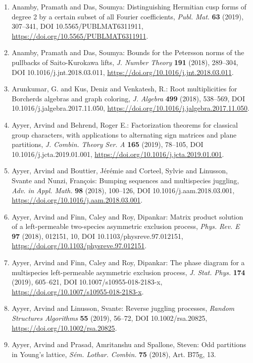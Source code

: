 \begin{enumerate}
\item Anamby, Pramath and Das, Soumya: Distinguishing {H}ermitian cusp forms of degree 2 by a certain
subset of all {F}ourier coefficients, \emph{Publ. Mat.} {\bf 63} (2019), 307--341, DOI 10.5565/PUBLMAT6311911, \url{https://doi.org/10.5565/PUBLMAT6311911}.
\item Anamby, Pramath and Das, Soumya: Bounds for the {P}etersson norms of the pullbacks of
{S}aito-{K}urokawa lifts, \emph{J. Number Theory} {\bf 191} (2018), 289--304, DOI 10.1016/j.jnt.2018.03.011, \url{https://doi.org/10.1016/j.jnt.2018.03.011}.
\item Arunkumar, G. and Kus, Deniz and Venkatesh, R.: Root multiplicities for {B}orcherds algebras and graph
coloring, \emph{J. Algebra} {\bf 499} (2018), 538--569, DOI 10.1016/j.jalgebra.2017.11.050, \url{https://doi.org/10.1016/j.jalgebra.2017.11.050}.
\item Ayyer, Arvind and Behrend, Roger E.: Factorization theorems for classical group characters, with
applications to alternating sign matrices and plane
partitions, \emph{J. Combin. Theory Ser. A} {\bf 165} (2019), 78--105, DOI 10.1016/j.jcta.2019.01.001, \url{https://doi.org/10.1016/j.jcta.2019.01.001}.
\item Ayyer, Arvind and Bouttier, J\'{e}r\'{e}mie and Corteel, Sylvie and
Linusson, Svante and Nunzi, Fran\c{c}ois: Bumping sequences and multispecies juggling, \emph{Adv. in Appl. Math.} {\bf 98} (2018), 100--126, DOI 10.1016/j.aam.2018.03.001, \url{https://doi.org/10.1016/j.aam.2018.03.001}.
\item Ayyer, Arvind and Finn, Caley and Roy, Dipankar: Matrix product solution of a left-permeable two-species
asymmetric exclusion process, \emph{Phys. Rev. E} {\bf 97} (2018), 012151, 10, DOI 10.1103/physreve.97.012151, \url{https://doi.org/10.1103/physreve.97.012151}.
\item Ayyer, Arvind and Finn, Caley and Roy, Dipankar: The phase diagram for a multispecies left-permeable asymmetric
exclusion process, \emph{J. Stat. Phys.} {\bf 174} (2019), 605--621, DOI 10.1007/s10955-018-2183-x, \url{https://doi.org/10.1007/s10955-018-2183-x}.
\item Ayyer, Arvind and Linusson, Svante: Reverse juggling processes, \emph{Random Structures Algorithms} {\bf 55} (2019), 56--72, DOI 10.1002/rsa.20825, \url{https://doi.org/10.1002/rsa.20825}.
\item Ayyer, Arvind and Prasad, Amritanshu and Spallone, Steven: Odd partitions in {Y}oung's lattice, \emph{S\'{e}m. Lothar. Combin.} {\bf 75} (2018), Art. B75g, 13.

\end{enumerate}

